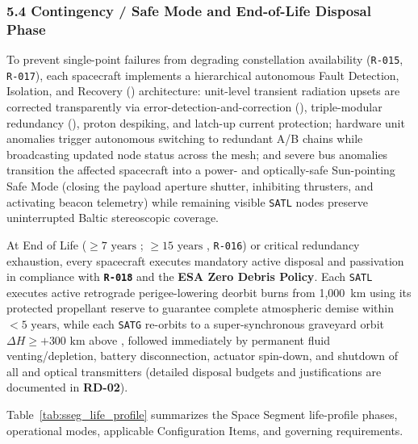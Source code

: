 \subsubsection{5.4 Contingency / Safe Mode and End-of-Life Disposal Phase}

To prevent single-point failures from degrading constellation availability (\texttt{R-015}, \texttt{R-017}), each spacecraft implements a hierarchical autonomous Fault Detection, Isolation, and Recovery () architecture: unit-level transient radiation upsets are corrected transparently via error-detection-and-correction (), triple-modular redundancy (), proton despiking, and latch-up current protection; hardware unit anomalies trigger autonomous switching to redundant A/B chains while broadcasting updated node status across the  mesh; and severe bus anomalies transition the affected spacecraft into a power- and optically-safe Sun-pointing Safe Mode (closing the payload aperture shutter, inhibiting thrusters, and activating  beacon telemetry) while remaining visible \texttt{SATL} nodes preserve uninterrupted Baltic stereoscopic coverage.

At End of Life ($\ge 7\text{ years}$ ; $\ge 15\text{ years}$ , \texttt{R-016}) or critical redundancy exhaustion, every spacecraft executes mandatory active disposal and passivation in compliance with \textbf{\texttt{R-018}} and the \textbf{ESA Zero Debris Policy}. Each \texttt{SATL} executes active retrograde perigee-lowering deorbit burns from 1,000~km using its protected propellant reserve to guarantee complete atmospheric demise within $< 5\text{ years}$, while each \texttt{SATG} re-orbits to a super-synchronous graveyard orbit $\Delta H \ge +300\text{ km}$ above , followed immediately by permanent fluid venting/depletion, battery disconnection, actuator spin-down, and shutdown of all  and optical transmitters (detailed disposal budgets and justifications are documented in \textbf{RD-02}).

Table~\ref{tab:sseg_life_profile} summarizes the Space Segment life-profile phases, operational modes, applicable Configuration Items, and governing requirements.

